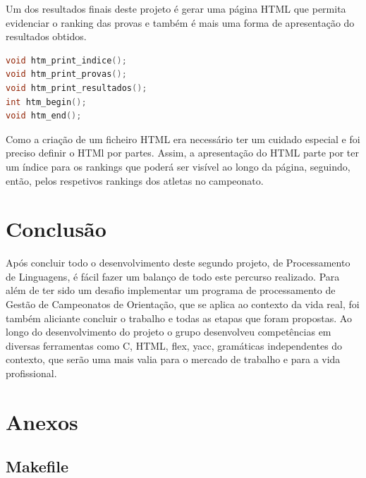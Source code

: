 \documentclass[11pt, a4paper, oneside]{article}
\begin{document}
Um dos resultados finais deste projeto é gerar uma página HTML que permita evidenciar o ranking das provas e também é mais uma forma de apresentação do resultados obtidos.

\begin{lstlisting}[language=C, caption={Assinatura das funções.}]
void htm_print_indice();
void htm_print_provas();
void htm_print_resultados();
int htm_begin();
void htm_end();
\end{lstlisting}

Como a criação de um ficheiro HTML era necessário ter um cuidado especial e foi preciso definir o HTMl por partes.
Assim, a apresentação do HTML parte por ter um índice para os rankings que poderá ser visível ao longo da página, seguindo, então, pelos respetivos rankings dos atletas no campeonato.

\newpage
\section{Conclusão}

Após concluir todo o desenvolvimento deste segundo projeto, de Processamento de Linguagens, é fácil fazer um balanço de todo este percurso realizado. Para além de ter sido um desafio implementar um programa de processamento de Gestão de Campeonatos de Orientação, que se aplica ao contexto da vida real, foi também aliciante concluir o trabalho e todas as etapas que foram propostas.
Ao longo do desenvolvimento do projeto o grupo desenvolveu competências em diversas ferramentas como \textsf{C}, HTML, \textsf{flex}, \textsf{yacc}, gramáticas independentes do contexto, que serão uma mais valia para o mercado de trabalho e para a vida profissional. 


\newpage
\section{Anexos}

\subsection{Makefile}
\end{document}
